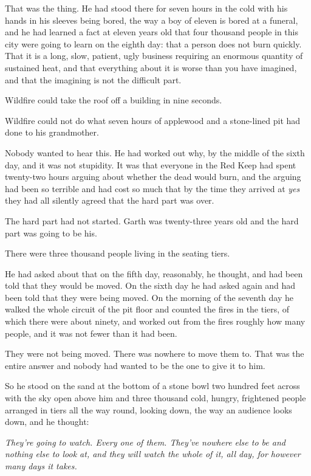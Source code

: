 That was the thing. He had stood there for seven hours in the cold with his hands in his sleeves being bored, the way a boy of eleven is bored at a funeral, and he had learned a fact at eleven years old that four thousand people in this city were going to learn on the eighth day: that a person does not burn quickly. That it is a long, slow, patient, ugly business requiring an enormous quantity of sustained heat, and that everything about it is worse than you have imagined, and that the imagining is not the difficult part.

Wildfire could take the roof off a building in nine seconds.

Wildfire could not do what seven hours of applewood and a stone-lined pit had done to his grandmother.

Nobody wanted to hear this. He had worked out why, by the middle of the sixth day, and it was not stupidity. It was that everyone in the Red Keep had spent twenty-two hours arguing about whether the dead would burn, and the arguing had been so terrible and had cost so much that by the time they arrived at \textit{yes} they had all silently agreed that the hard part was over.

The hard part had not started. Garth was twenty-three years old and the hard part was going to be his.

\sceneBreak

There were three thousand people living in the seating tiers.

He had asked about that on the fifth day, reasonably, he thought, and had been told that they would be moved. On the sixth day he had asked again and had been told that they were being moved. On the morning of the seventh day he walked the whole circuit of the pit floor and counted the fires in the tiers, of which there were about ninety, and worked out from the fires roughly how many people, and it was not fewer than it had been.

They were not being moved. There was nowhere to move them to. That was the entire answer and nobody had wanted to be the one to give it to him.

So he stood on the sand at the bottom of a stone bowl two hundred feet across with the sky open above him and three thousand cold, hungry, frightened people arranged in tiers all the way round, looking down, the way an audience looks down, and he thought:

\textit{They’re going to watch. Every one of them. They’ve nowhere else to be and nothing else to look at, and they will watch the whole of it, all day, for however many days it takes.}

